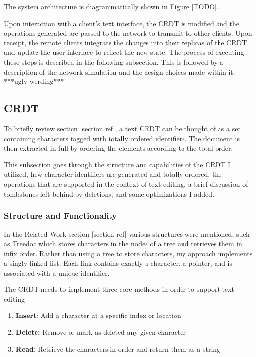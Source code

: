 \documentclass[12pt,a4paper,twoside,openright]{report}
\begin{document}
	The system architecture is diagrammatically shown in Figure [TODO].
	
	Upon interaction with a client's text interface, the CRDT is modified and the operations generated are passed to the network to transmit to other clients. Upon receipt, the remote clients integrate the changes into their replicas of the CRDT and update the user interface to reflect the new state. The process of executing these steps is described in the following subsection. This is followed by a description of the network simulation and the design choices made within it.  ***ugly wording***
	
	
	\subsection{CRDT}
		To briefly review section [section ref], a text CRDT can be thought of as a set containing characters tagged with totally ordered identifiers. The document is then extracted in full by ordering the elements according to the total order. 
		
		This subsection goes through the structure and capabilities of the CRDT I utilized, how character identifiers are generated and totally ordered, the operations that are supported in the context of text editing, a brief discussion of tombstones left behind by deletions, and some optimizations I added.
		
		\subsubsection{Structure and Functionality}
		In the Related Work section [section ref] various structures were mentioned, such as Treedoc which stores characters in the nodes of a tree and retrieves them in infix order. Rather than using a tree to store characters, my approach implements a singly-linked list. Each link contains exactly a character, a pointer, and is associated with a unique identifier.
		
		The CRDT needs to implement three core methods in order to support text editing
		\begin{enumerate}
			\item \textbf{Insert:} Add a character at a specific index or location
			\item \textbf{Delete:} Remove or mark as deleted any given character
			\item \textbf{Read:} Retrieve the characters in order and return them as a string
		\end{enumerate} 
		
\end{document}
